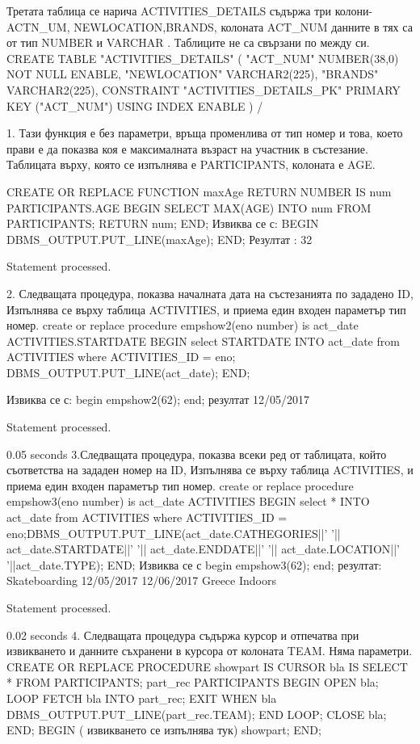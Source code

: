 Третата таблица се нарича ACTIVITIES_DETAILS съдържа три колони- ACTN_UM, NEWLOCATION,BRANDS, колоната ACT_NUM данните в тях са от тип NUMBER и  VARCHAR . Таблиците не са свързани по между си. 
CREATE TABLE  "ACTIVITIES_DETAILS" 
   (	"ACT_NUM" NUMBER(38,0) NOT NULL ENABLE, 
	"NEWLOCATION" VARCHAR2(225), 
	"BRANDS" VARCHAR2(225), 
	 CONSTRAINT "ACTIVITIES_DETAILS_PK" PRIMARY KEY ("ACT_NUM")
  USING INDEX  ENABLE
   )
/

1. Тази функция е без параметри, връща променлива от тип номер и това, което прави е да показва коя е максималната възраст на участник в състезание. 
Таблицата върху, която се изпълнява е PARTICIPANTS, колоната е AGE. 

CREATE OR REPLACE FUNCTION maxAge
RETURN NUMBER
IS
num PARTICIPANTS.AGE%
BEGIN 
SELECT MAX(AGE) INTO num 
FROM PARTICIPANTS;
RETURN num;
END;
Извиква се с:
BEGIN
DBMS_OUTPUT.PUT_LINE(maxAge);
END;
Резултат :
32

Statement processed.

2. Следващата процедура, показва началната дата на състезанията по зададено ID,  Изпълнява се върху таблица ACTIVITIES, и приема един входен параметър тип номер. 
create or replace procedure empshow2(eno number)
is
act_date ACTIVITIES.STARTDATE%
BEGIN
select STARTDATE INTO act_date from ACTIVITIES where ACTIVITIES_ID = eno;
DBMS_OUTPUT.PUT_LINE(act_date);
END;

Извиква се с:
begin
empshow2(62);
end;
резултат 
12/05/2017

Statement processed.

0.05 seconds
3.Следващата процедура, показва всеки ред от таблицата, който съответства на зададен номер на ID,  Изпълнява се върху таблица ACTIVITIES, и приема един входен параметър тип номер. 
create or replace procedure empshow3(eno number)
is
act_date ACTIVITIES%
BEGIN
select * INTO act_date from ACTIVITIES where ACTIVITIES_ID = eno;DBMS_OUTPUT.PUT_LINE(act_date.CATHEGORIES||'     '|| act_date.STARTDATE||'     '|| act_date.ENDDATE||'     '|| act_date.LOCATION||'     '||act_date.TYPE);
END;
Извиква се с
begin
empshow3(62);
end;
резултат:
Skateboarding      12/05/2017     12/06/2017     Greece     Indoors

Statement processed.

0.02 seconds
4.  Следващата процедура съдържа курсор и отпечатва при извикването и данните съхранени в курсора от колоната TEAM. Няма параметри. 
CREATE OR REPLACE PROCEDURE showpart
IS
CURSOR bla IS SELECT * FROM PARTICIPANTS;
part_rec PARTICIPANTS%
BEGIN
OPEN bla;
LOOP
FETCH bla INTO part_rec;
EXIT WHEN bla%
DBMS_OUTPUT.PUT_LINE(part_rec.TEAM);
END LOOP;
CLOSE bla;
END;
BEGIN    ( извикването се изпълнява тук)
showpart;
END;

